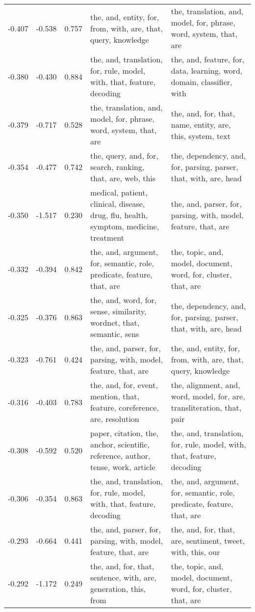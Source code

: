 \begin{tabular}{cccp{5cm}p{5cm}}
-0.407 & -0.538 & 0.757 & the, and, entity, for, from, with, are, that, query, knowledge & the, translation, and, model, for, phrase, word, system, that, are \\
-0.380 & -0.430 & 0.884 & the, and, translation, for, rule, model, with, that, feature, decoding & the, and, feature, for, data, learning, word, domain, classifier, with \\
-0.379 & -0.717 & 0.528 & the, translation, and, model, for, phrase, word, system, that, are & the, and, for, that, name, entity, are, this, system, text \\
-0.354 & -0.477 & 0.742 & the, query, and, for, search, ranking, that, are, web, this & the, dependency, and, for, parsing, parser, that, with, are, head \\
-0.350 & -1.517 & 0.230 & medical, patient, clinical, disease, drug, flu, health, symptom, medicine, treatment & the, and, parser, for, parsing, with, model, feature, that, are \\
-0.332 & -0.394 & 0.842 & the, and, argument, for, semantic, role, predicate, feature, that, are & the, topic, and, model, document, word, for, cluster, that, are \\
-0.325 & -0.376 & 0.863 & the, and, word, for, sense, similarity, wordnet, that, semantic, sens & the, dependency, and, for, parsing, parser, that, with, are, head \\
-0.323 & -0.761 & 0.424 & the, and, parser, for, parsing, with, model, feature, that, are & the, and, entity, for, from, with, are, that, query, knowledge \\
-0.316 & -0.403 & 0.783 & the, and, for, event, mention, that, feature, coreference, are, resolution & the, alignment, and, word, model, for, are, transliteration, that, pair \\
-0.308 & -0.592 & 0.520 & paper, citation, the, anchor, scientific, reference, author, tense, work, article & the, and, translation, for, rule, model, with, that, feature, decoding \\
-0.306 & -0.354 & 0.863 & the, and, translation, for, rule, model, with, that, feature, decoding & the, and, argument, for, semantic, role, predicate, feature, that, are \\
-0.293 & -0.664 & 0.441 & the, and, parser, for, parsing, with, model, feature, that, are & the, and, for, that, are, sentiment, tweet, with, this, our \\
-0.292 & -1.172 & 0.249 & the, and, for, that, sentence, with, are, generation, this, from & the, topic, and, model, document, word, for, cluster, that, are \\

\end{tabular}
